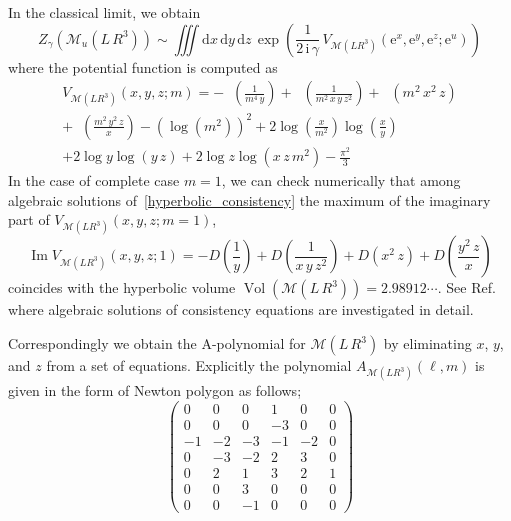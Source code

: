 \documentclass[12pt,reqno]{amsart}
\numberwithin{equation}{section}
\renewcommand{\Im}{\operatorname{Im}}
\DeclareMathOperator{\Li}{Li_2}
\DeclareMathOperator{\Vol}{Vol}
\newcommand{\I}{\mathrm{i}}
\newcommand{\E}{\mathrm{e}}
\begin{document}
In the classical limit, we obtain
\begin{equation}
  Z_\gamma(\mathcal{M}_u(L \, R^3))
  \sim
  \iiint \mathrm{d} x \, \mathrm{d} y \, \mathrm{d} z \,
  \exp
  \left(
    \frac{1}{2 \, \I \, \gamma} \,
    V_{\mathcal{M}(L R^3)}(\E^x , \E^y , \E^z ; \E^u)
  \right)
\end{equation}
where the potential function is computed as
\begin{multline}
  V_{\mathcal{M}(L R^3)}(x , y , z; m)
  =
  - \Li\left(\frac{1}{m^4 \, y}\right)
  +  \Li\left(\frac{1}{m^2 \, x  \, y \, z^2}\right)
  + \Li\left( m^2 \, x^2 \, z \right)
  \\
  + \Li \left( \frac{m^2 \, y^2 \, z}{x} \right)
  -\left( \log \left( m^2 \right) \right)^2
  + 2 \log\left(\frac{x}{m^2}\right) \log\left(\frac{x}{y}\right)
  \\
  + 2 \log y \log ( y \, z) + 2 \log z \log(x \, z \, m^2)
  -\frac{\pi^2}{3}
\end{multline}
In the case of complete case $m=1$, we can check numerically
that among algebraic solutions of~\eqref{hyperbolic_consistency}
the maximum of the imaginary part of
$V_{\mathcal{M}(L R^3)}(x,y,z;m=1)$,
\begin{equation*}
  \Im V_{\mathcal{M}(L R^3)}(x , y , z; 1)
  =
  - D \left(\frac{1}{ y}\right)
  +  D \left(\frac{1}{ x  \, y \, z^2}\right)
  + D\left(  x^2 \, z \right)
  + D \left( \frac{ y^2 \, z}{x} \right)
\end{equation*}
coincides with the hyperbolic volume
$\Vol(\mathcal{M}(L \, R^3))= 2.98912 \cdots$.
See Ref.~ where algebraic solutions of consistency
equations are investigated in detail.

Correspondingly we obtain the A-polynomial for  $\mathcal{M}(L \, R^3)$
by eliminating $x$, $y$, and $z$ from a set of equations.
Explicitly the polynomial $A_{\mathcal{M}(L R^3)}(\ell,m)$ is given in
the form of Newton
polygon as follows;
\begin{equation*}
  \begin{pmatrix}
    0 & 0 & 0 & 1 & 0 & 0
    \\
    0 & 0 & 0 & -3 & 0 & 0
    \\
    -1 & -2 & -3 & -1 & -2 & 0
    \\
    0 & -3 & -2 & 2 & 3 & 0
    \\
    0 & 2 & 1 & 3 & 2 & 1
    \\
    0 & 0 & 3 & 0 & 0 & 0
    \\
    0 & 0  & -1 & 0 & 0 & 0
  \end{pmatrix}
\end{equation*}
\end{document}
